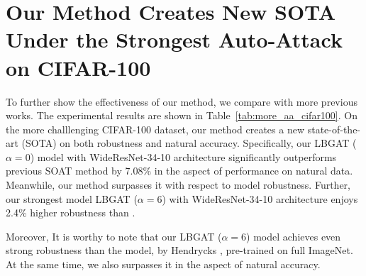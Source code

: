 \documentclass[10pt,twocolumn,letterpaper]{article}
\begin{document}
\vspace{0.2in}
\section{Our Method Creates New SOTA Under the Strongest Auto-Attack on CIFAR-100}
To further show the effectiveness of our method, we compare with more previous works. The experimental results are shown in Table~\ref{tab:more_aa_cifar100}. On the more challlenging CIFAR-100 dataset, our method creates a new state-of-the-art (SOTA) on both robustness and natural accuracy. Specifically, our LBGAT ($\alpha=0$) model with WideResNet-34-10 architecture significantly outperforms previous SOAT method \cite{chen2020efficient} by 7.08\% in the aspect of performance on natural data. Meanwhile, our method surpasses it with respect to model robustness. Further, our strongest model LBGAT ($\alpha=6$) with WideResNet-34-10 architecture enjoys 2.4\% higher robustness than \cite{chen2020efficient}.  

Moreover, It is worthy to note that our LBGAT ($\alpha=6$) model achieves even strong robustness than the model, by Hendrycks \etal \cite{hendrycks2019using}, pre-trained on full ImageNet. At the same time, we also surpasses it in the aspect of natural accuracy.   
\end{document}
